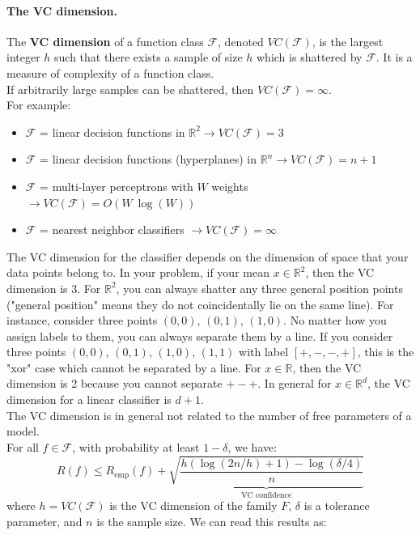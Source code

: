 \paragraph*{The VC dimension.} The \textbf{VC dimension} of a function class $\mathcal{ F }$, denoted $VC(\mathcal{ F })$, is the largest integer $h$ such that there exists a sample of size $h$ which is shattered by $\mathcal{ F }$. It is a measure of complexity of a function class.\\
If arbitrarily large samples can be shattered, then $VC(\mathcal{ F }) = \infty$.\\
For example:
\begin{itemize}
	\item $\mathcal{ F }$ = linear decision functions in $\mathbb{R}^2 \rightarrow VC(\mathcal{ F }) = 3$
	\item $\mathcal{ F }$ = linear decision functions (hyperplanes) in $\mathbb{R}^n \rightarrow VC(\mathcal{ F }) = n+1$ 
	\item $\mathcal{ F }$ = multi-layer perceptrons with $W$ weights $\rightarrow VC(\mathcal{ F }) = O(W~\log( W))$
	\item $\mathcal{ F }$ = nearest neighbor classifiers $\rightarrow VC(\mathcal{ F }) = \infty$
\end{itemize}


The VC dimension for the classifier depends on the dimension of space that your data points belong to. In your problem, if your mean $x\in \mathbb{R}^2$, then the VC dimension is $3$. For $\mathbb{R}^2$, you can always shatter any three general position points ("general position" means they do not coincidentally lie on the same line). For instance, consider three points $(0,0)$, $(0,1)$, $(1,0)$. No matter how you assign labels to them, you can always separate them by a line. If you consider three points $(0,0)$, $(0,1)$, $(1,0)$, $(1,1)$ with label $[+,-,-,+]$, this is the "xor" case which cannot be separated by a line. For $x\in\mathbb{R}$, then the VC dimension is 2 because you cannot separate $+-+$. In general for $x\in\mathbb{R}^d$, the VC dimension for a linear classifier is $d+1$.\\

The VC dimension is in general not related to the number of free parameters of a model.\\
For all $f \in \mathcal{ F }$, with probability at least $1-\delta$, we have:
$$
R ( f ) \leq R _ { \mathrm { emp } } ( f ) + \underbrace{\sqrt { \frac { h ( \log ( 2 n / h ) + 1 ) - \log ( \delta / 4 ) } { n } }}_{\text{VC confidence}}
$$
where $h=VC(\mathcal{ F })$ is the VC dimension of the family $F$, $\delta$ is a tolerance parameter, and $n$ is the sample size. We can read this results as:\\

